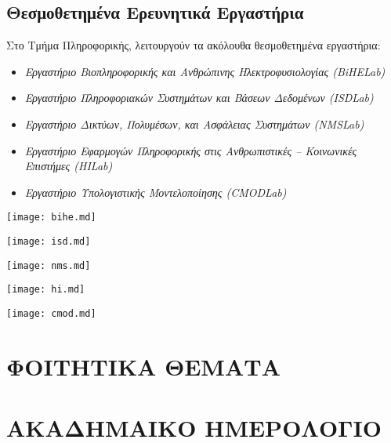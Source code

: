 \hypertarget{ux3b8ux3b5ux3c3ux3bcux3bfux3b8ux3b5ux3c4ux3b7ux3bcux3adux3bdux3b1-ux3b5ux3c1ux3b5ux3c5ux3bdux3b7ux3c4ux3b9ux3baux3ac-ux3b5ux3c1ux3b3ux3b1ux3c3ux3c4ux3aeux3c1ux3b9ux3b1}{%
\subsection{Θεσμοθετημένα Ερευνητικά
Εργαστήρια}\label{ux3b8ux3b5ux3c3ux3bcux3bfux3b8ux3b5ux3c4ux3b7ux3bcux3adux3bdux3b1-ux3b5ux3c1ux3b5ux3c5ux3bdux3b7ux3c4ux3b9ux3baux3ac-ux3b5ux3c1ux3b3ux3b1ux3c3ux3c4ux3aeux3c1ux3b9ux3b1}}

Στο Τμήμα Πληροφορικής, λειτουργούν τα ακόλουθα θεσμοθετημένα
εργαστήρια:

\begin{itemize}
\tightlist
\item
  \emph{Εργαστήριο Βιοπληροφορικής και Ανθρώπινης Ηλεκτροφυσιολογίας
  (BiHELab)}
\item
  \emph{Εργαστήριο Πληροφοριακών Συστημάτων και Βάσεων Δεδομένων
  (ISDLab)}
\item
  \emph{Εργαστήριο Δικτύων, Πολυμέσων, και Ασφάλειας Συστημάτων
  (NMSLab)}
\item
  \emph{Εργαστήριο Εφαρμογών Πληροφορικής στις Ανθρωπιστικές --
  Κοινωνικές Επιστήμες (HILab)}
\item
  \emph{Εργαστήριο Υπολογιστικής Μοντελοποίησης (CMODLab)}
\end{itemize}

\texttt{[image: bihe.md]}

\texttt{[image: isd.md]}

\texttt{[image: nms.md]}

\texttt{[image: hi.md]}

\texttt{[image: cmod.md]}

\hypertarget{ux3c6ux3bfux3b9ux3c4ux3b7ux3c4ux3b9ux3baux3b1-ux3b8ux3b5ux3bcux3b1ux3c4ux3b1}{%
\section{ΦΟΙΤΗΤΙΚΑ
ΘΕΜΑΤΑ}\label{ux3c6ux3bfux3b9ux3c4ux3b7ux3c4ux3b9ux3baux3b1-ux3b8ux3b5ux3bcux3b1ux3c4ux3b1}}

\hypertarget{ux3b1ux3baux3b1ux3b4ux3b7ux3bcux3b1ux3b9ux3baux3bf-ux3b7ux3bcux3b5ux3c1ux3bfux3bbux3bfux3b3ux3b9ux3bf}{%
\section{ΑΚΑΔΗΜΑΙΚΟ
ΗΜΕΡΟΛΟΓΙΟ}\label{ux3b1ux3baux3b1ux3b4ux3b7ux3bcux3b1ux3b9ux3baux3bf-ux3b7ux3bcux3b5ux3c1ux3bfux3bbux3bfux3b3ux3b9ux3bf}}
